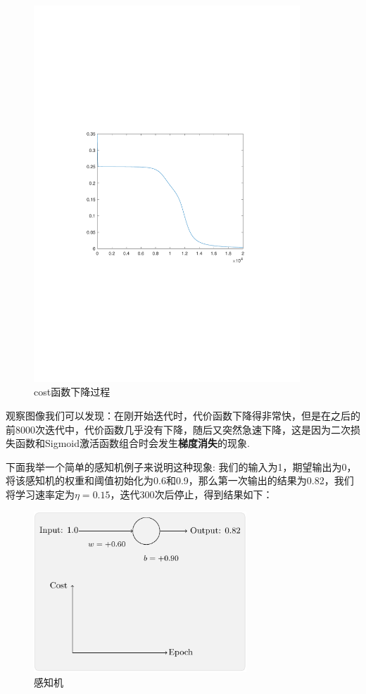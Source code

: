 \begin{figure}[H]
\centering
\includegraphics[width=10cm]{fig/xor1.pdf}
\caption{cost函数下降过程}
\end{figure}

观察图像我们可以发现：在刚开始迭代时，代价函数下降得非常快，但是在之后的前8000次迭代中，代价函数几乎没有下降，随后又突然急速下降，这是因为二次损失函数和Sigmoid激活函数组合时会发生\textbf{梯度消失}的现象.

下面我举一个简单的感知机例子来说明这种现象:
我们的输入为1，期望输出为0，将该感知机的权重和阈值初始化为0.6和0.9，那么第一次输出的结果为0.82，我们将学习速率定为$\eta=0.15$，迭代300次后停止，得到结果如下：
\begin{figure}[H]
\centering
\includegraphics[width=8cm]{fig/1.pdf}
\caption{感知机}
\end{figure}

